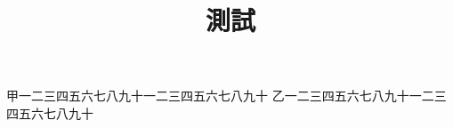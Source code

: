 \documentclass[四库全书]{ltc-guji}
\title{測試}
\begin{document}
\pageSetup{}
\begin{正文}
甲一二三四五六七八九十一二三四五六七八九十
乙一二三四五六七八九十一二三四五六七八九十
\end{正文}
\end{document}
